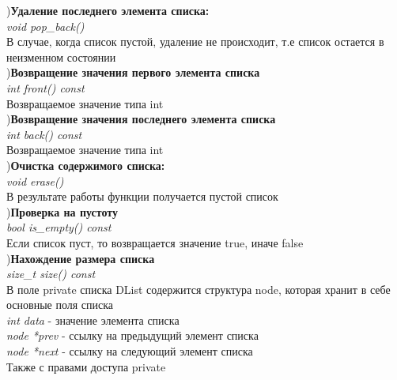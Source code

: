 \documentclass[a4paper]{article}
\begin{document}
{	     \hfill {}){\bf Удаление последнего элемента списка:}\\
	     \hfill \break
	     \textit{void pop\_back()}\\
	     \hfill \break
	     \hfill \break
	  В случае, когда список пустой, удаление не происходит, т.е список остается в неизменном состоянии\\  
	  \hfill \break
	  \hfill {}){\bf Возвращение значения первого элемента списка}\\
	     \hfill \break
	     \textit{int front() const}\\
	     \hfill \break
	     \hfill \break
	  Возвращаемое значение типа int\\    
	     \hfill \break
	     \hfill {}){\bf Возвращение значения последнего элемента списка}\\
	    \hfill \break
	    \textit{int back() const}\\
	    \hfill \break
	    \hfill \break
	Возвращаемое значение типа int\\    
     	\hfill \break
	    \hfill {}){\bf Очистка содержимого списка:}\\
	    \hfill \break
	    \textit{void erase()}\\        
	    \hfill \break
	    \hfill \break
	В результате работы функции получается пустой список\\
	    \hfill \break
	    \hfill {}){\bf Проверка на пустоту}\\
	    \hfill \break
	    \textit{bool is\_empty() const}\\
	    \hfill \break
	    \hfill \break
	Если список пуст, то возвращается значение true, иначе false\\ 
	    \hfill \break
	    \hfill {}){\bf Нахождение размера списка}\\
	    \hfill \break
	    \textit{size\_t size() const}\\
	    \hfill \break
	    \hfill \break 
	В поле private списка DList содержится структура node, которая хранит в себе основные поля списка\\
	    \hfill \break
	    \textit{int data} - значение элемента списка\\
	    \textit{node *prev} - ссылку на предыдущий элемент списка\\        
	    \textit{node *next} - ссылку на следующий элемент списка\\
        \hfill\break
    Также с правами доступа private\\
}
\end{document}
